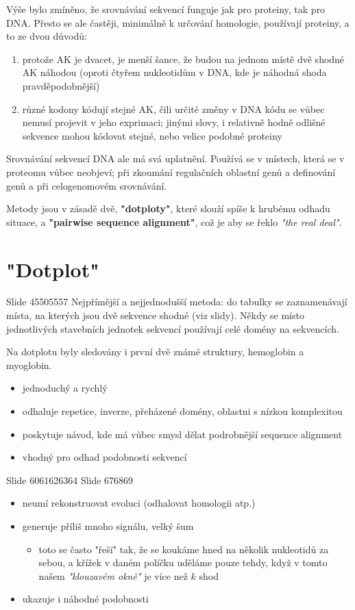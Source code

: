 \documentclass[DIV=8]{scrreprt}
\begin{document}
Výše bylo zmíněno, že srovnávání sekvencí funguje jak pro proteiny, tak pro DNA. Přesto se ale častěji, minimálně k určování homologie, používají proteiny, a to ze dvou důvodů:
\begin{enumerate}
    \item protože AK je dvacet, je menší šance, že budou na jednom místě dvě shodné AK náhodou (oproti čtyřem nukleotidům v DNA, kde je náhodná shoda pravděpodobnější)
    \item různé kodony kódují stejné AK, čili určité změny v DNA kódu se vůbec nemusí projevit v jeho exprimaci; jinými slovy, i relativně hodně odlišné sekvence mohou kódovat stejné, nebo velice podobné proteiny
\end{enumerate}


Srovnávání sekvencí DNA ale má svá uplatnění. Používá se v místech, která se v proteomu vůbec neobjeví; při zkoumání regulačních oblastní genů a definování genů a při celogenomovém srovnávání.

Metody jsou v zásadě dvě, \textbf{"dotploty"}, které slouží spíše k hrubému odhadu situace, a \textbf{"pairwise sequence alignment"}, což je aby se řeklo \emph{"the real deal"}.

\section{"Dotplot"}

Slide 45505557
Nejpřímější a nejjednodušší metoda: do tabulky se zaznamenávají místa, na kterých jsou dvě sekvence shodné (viz slidy). Někdy se místo jednotlivých stavebních jednotek sekvencí používají celé domény na sekvencích.

Na dotplotu byly sledovány i první dvě známé struktury, hemoglobin a myoglobin.

\begin{itemize}
    \item jednoduchý a rychlý
    \item odhaluje repetice, inverze, přeházené domény, oblastni s nízkou komplexitou
    \item poskytuje návod, kde má vůbec smysl dělat podrobnější sequence alignment
    \item vhodný pro odhad podobnosti sekvencí
\end{itemize}


Slide 6061626364
Slide 676869
\begin{itemize}
    \item neumí rekonstruovat evoluci (odhalovat homologii atp.)
    \item generuje příliš mnoho signálu, velký šum
\begin{itemize}
    \item toto se často "řeší" tak, že se koukáme hned na několik nukleotidů za sebou, a křížek v daném políčku uděláme pouze tehdy, když v tomto našem \emph{"klouzavém okně"} je více než \(k\) shod
\end{itemize}

    \item ukazuje i náhodné podobnosti
\end{itemize}
\end{document}
